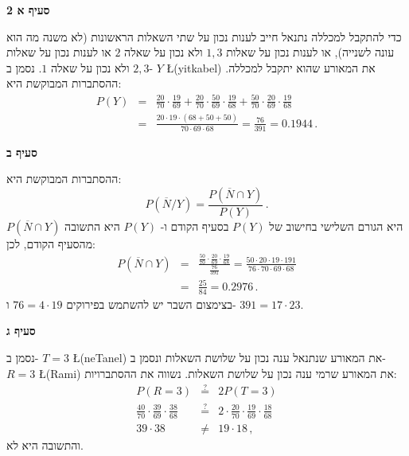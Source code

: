 \textbf{סעיף א 2}

כדי להתקבל למכללה נתנאל חייב לענות נכון על שתי השאלות הראשונות (לא משנה מה הוא עונה לשנייה), או לענות נכון על שאלות 
$1,3$
ולא נכון על שאלה 
$2$
או לענות נכון על שאלות
$2,3$
ולא נכון על שאלה
$1$.
נסמן ב-%
$Y$ \L{(yitkabel)}
את המאורע שהוא יתקבל למכללה. ההסתברות המבוקשת היא:
\begin{eqnarray*}
P(Y)&=&
\frac{20}{70}\cdot\frac{19}{69}+
\frac{20}{70}\cdot\frac{50}{69}\cdot\frac{19}{68}+
\frac{50}{70}\cdot\frac{20}{69}\cdot\frac{19}{68}\\[8pt]
&=&\frac{20\cdot 19\cdot (68+50+50)}{70\cdot 69\cdot 68}=
\frac{76}{391}=0.1944\,.
\end{eqnarray*}

\textbf{סעיף ב}

ההסתברות המבוקשת היא:
\[
P(\overline{N}/Y)=\frac{P(\overline{N}\cap Y)}{P(Y)}\,.
\]
$P(\overline{N}\cap Y)$
היא הגורם השלישי בחישוב של 
$P(Y)$
בסעיף הקודם ו-%
$P(Y)$
היא התשובה מהסעיף הקודם, לכן:
\begin{eqnarray*}
P(\overline{N}\cap Y)&=&
\frac{\frac{50}{70}\cdot\frac{20}{69}\cdot\frac{19}{68}}
{\frac{76}{391}}=\frac{50\cdot 20\cdot 19\cdot 191}{76\cdot 70\cdot 69\cdot 68}\\[10pt]
&=&\frac{25}{84}=0.2976\,.
\end{eqnarray*}
בצימצום השבר יש להשתמש בפירוקים
$76=4\cdot 19$
ו-%
$391=17\cdot 23$.

\textbf{סעיף ג}

נסמן ב-%
$T=3$ \L{(neTanel)}
את המאורע שנתנאל ענה נכון על שלושת השאלות ונסמן ב-%
$R=3$ \L{(Rami)}
את המאורע שרמי ענה נכון על שלושת השאלות. נשווה את ההסתברויות:
\begin{eqnarray*}
P(R=3)&\stackrel{?}{=}&2P(T=3)\\[8pt]
\frac{40}{70}\cdot\frac{39}{69}\cdot\frac{38}{68}
&\stackrel{?}{=}&
2\cdot\frac{20}{70}\cdot\frac{19}{69}\cdot\frac{18}{68}\\[8pt]
39\cdot 38 &\neq& 19\cdot 18\,,
\end{eqnarray*}
והתשובה היא לא.
